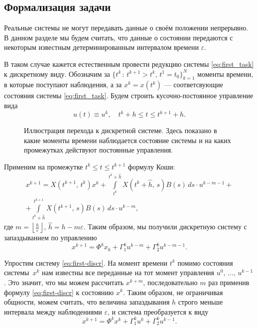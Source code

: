 \subsection{Формализация задачи}

Реальные системы не могут передавать данные о своём положении непрерывно.
В данном разделе мы будем считать, что данные о состоянии передаются с некоторым известным детерминированным интервалом времени $\varepsilon$.

В таком случае кажется естественным провести редукцию системы \eqref{eq:first_task} к дискретному виду.
Обозначим за $\{t^k\,:\,t^{k+1} > t^k,\,t^1=t_0\}_{k=1}^N$ моменты времени, в которые поступают наблюдения, а за $x^k = x(t^k)$ --- соответсвующие состояния системы \eqref{eq:first_task}.
Будем строить кусочно-постоянное управление вида
$$
        u(t) \equiv u^{k},
        \quad
        t^{k} + h \leqslant t \leqslant t^{k+1} + h.
$$

\begin{figure}[h]
        \centering
        
        \caption{Иллюстрация перехода к дискретной системе. Здесь показано в какие моменты времени наблюдается состояние системы и на каких промежутках действуют постоянные управления.}
        \vspace{1cm}
\end{figure}

Применим на промежутке $t^k \leqslant t \leqslant t^{k+1}$ формулу Коши:
\begin{multline*}
x^{k+1} = X(t^{k+1},\,t^k)x^k
+
\int\limits_{t^k}^{t^{k} + \hat h} X(t^{k} + \hat h,\,s)B(s)\,ds\cdot u^{k-m-1}
+\\+
\int\limits_{t^{k} +\hat h}^{t^{k+1}} X(t^{k+1},\,s)B(s)\,ds\cdot u^{k-m},
\end{multline*}
где $m = \left\lfloor\frac{h}{\varepsilon}\right\rfloor$, $\hat h = h - m\varepsilon$.
Таким образом, мы получили дискретную систему с запаздыванием по управлению
\begin{equation}\label{eq:first-discr}
        x^{k+1} = \Phi^k x_k + \Gamma_1^k u^{k-m} + \Gamma_2^k u^{k-m-1}.
\end{equation}

Упростим систему \eqref{eq:first-discr}. На момент времени $t^k$ помимо состояния системы~$x^{k}$ нам известны все переданные на тот момент управления $u^0,\,\ldots,\,u^{k-1}$. Это значит, что мы можем рассчитать $x^{k+m}$, последовательно $m$ раз применив формулу \eqref{eq:first-discr} к состоянию $x^k$. Таким образом, не ограничивая общности, можем считать, что величина запаздывания $h$ строго меньше интервала между наблюдениями $\varepsilon$, и система преобразуется к виду
\begin{equation}\label{eq:main-discr}
        x^{k+1} = \Phi^kx^k + \Gamma_1^ku^k + \Gamma_2^ku^{k-1}.
\end{equation}

